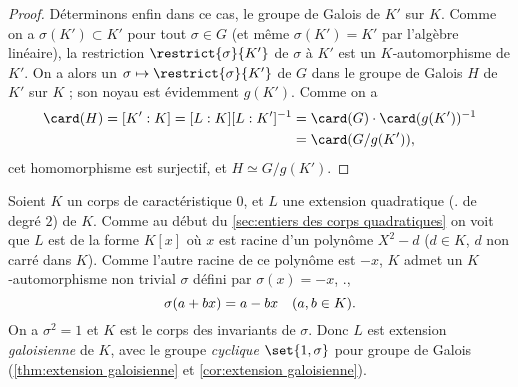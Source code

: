 \documentclass[11pt, %
  title in boldface,
  theorem in new line,
  theorem numbering = section,
  number theorems separately,
  simple name,
]{beaulivre}
\begin{document}
\begin{proof}
        Déterminons enfin dans ce cas, le groupe de Galois de \( K' \) sur \( K \). Comme on a \( \sigma(K') \subset K' \) pour tout \( \sigma \in G \) (et même \( \sigma(K') = K' \) par l'algèbre linéaire), la restriction \( \restrict{\sigma}{K'} \) de \( \sigma \) à \( K' \) est un \( K \)‑automorphisme de \( K' \). On a alors un  \( \sigma \mapsto \restrict{\sigma}{K'} \) de \( G \) dans le groupe de Galois \( H \) de \( K' \) sur \( K \) ; son noyau est évidemment \( g(K') \). Comme on a
        \begin{align*}
            \card(H) = [K':K] = [L:K][L:K']^{-1} &= \card(G) \cdot \card(g(K'))^{-1}\\
            &= \card(G/g(K')),
        \end{align*}
        cet homomorphisme est surjectif, et \( H \simeq G/g(K') \).
    \end{proof}

\smallskip
    \begin{example*}
        Soient \( K \) un corps de caractéristique \( 0 \), et \( L \) une extension quadratique (\ie. de degré \( 2 \)) de \( K \). Comme au début du \cref{sec:entiers des corps quadratiques} on voit que \( L \) est de la forme \( K[x] \) où \( x \) est racine d'un polynôme \( X^2-d \) (\( d \in K \), \( d \) non carré dans \( K \)). Comme l'autre racine de ce polynôme est \( -x \), \( K \) admet un \( K \)‑automorphisme non trivial \( \sigma \) défini par \( \sigma(x) = -x \), \ie.,
        \begin{equation}
            \sigma(a+bx) = a-bx \quad \text{(\( a,b \in K \))}.
        \end{equation}
        On a \( \sigma^2 = 1 \) et \( K \) est le corps des invariants de \( \sigma \). Donc \( L \) est extension \emph{galoisienne} de \( K \), avec le groupe \emph{cyclique} \( \set{1, \sigma} \) pour groupe de Galois (\cref{thm:extension galoisienne} et \cref{cor:extension galoisienne}).
    \end{example*}
\end{document}
